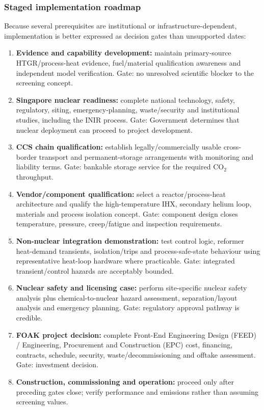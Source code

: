 \subsubsection{Staged implementation roadmap}
Because several prerequisites are institutional or infrastructure-dependent, implementation is better expressed as decision gates than unsupported dates:
\begin{enumerate}
\item \textbf{Evidence and capability development:} maintain primary-source HTGR/process-heat evidence, fuel/material qualification awareness and independent model verification. Gate: no unresolved scientific blocker to the screening concept.
\item \textbf{Singapore nuclear readiness:} complete national technology, safety, regulatory, siting, emergency-planning, waste/security and institutional studies, including the INIR process. Gate: Government determines that nuclear deployment can proceed to project development.
\item \textbf{CCS chain qualification:} establish legally/commercially usable cross-border transport and permanent-storage arrangements with monitoring and liability terms. Gate: bankable storage service for the required CO$_2$ throughput.
\item \textbf{Vendor/component qualification:} select a reactor/process-heat architecture and qualify the high-temperature IHX, secondary helium loop, materials and process isolation concept. Gate: component design closes temperature, pressure, creep/fatigue and inspection requirements.
\item \textbf{Non-nuclear integration demonstration:} test control logic, reformer heat-demand transients, isolation/trips and process-safe-state behaviour using representative heat-loop hardware where practicable. Gate: integrated transient/control hazards are acceptably bounded.
\item \textbf{Nuclear safety and licensing case:} perform site-specific nuclear safety analysis plus chemical-to-nuclear hazard assessment, separation/layout analysis and emergency planning. Gate: regulatory approval pathway is credible.
\item \textbf{FOAK project decision:} complete Front-End Engineering Design (FEED) / Engineering, Procurement and Construction (EPC) cost, financing, contracts, schedule, security, waste/decommissioning and offtake assessment. Gate: investment decision.
\item \textbf{Construction, commissioning and operation:} proceed only after preceding gates close; verify performance and emissions rather than assuming screening values.
\end{enumerate}


